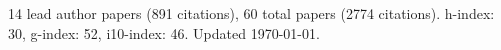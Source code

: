 14 lead author papers (891 citations),
60 total papers (2774 citations).\newline
h-index: 30, g-index: 52, i10-index: 46. Updated \today.